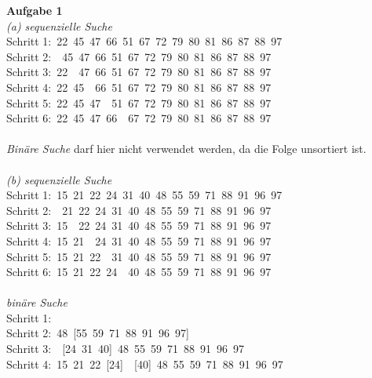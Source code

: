 \documentclass[12pt,a4paper]{article}
\begin{document}
\noindent \textbf{Aufgabe 1} \\
\textit{(a) sequenzielle Suche}\\
\indent Schritt 1:\quad {}\ 22\ 45\ 47\ 66\ 51\ 67\ 72\ 79\ 80\ 81\ 86\ 87\ 88\ 97\\
\indent Schritt 2:\ \ 45\ 47\ 66\ 51\ 67\ 72\ 79\ 80\ 81\ 86\ 87\ 88\ 97\\
\indent Schritt 3:\ 22\ \ 47\ 66\ 51\ 67\ 72\ 79\ 80\ 81\ 86\ 87\ 88\ 97\\
\indent Schritt 4:\ 22\ 45\ \ 66\ 51\ 67\ 72\ 79\ 80\ 81\ 86\ 87\ 88\ 97\\
\indent Schritt 5:\ 22\ 45\ 47\ \ 51\ 67\ 72\ 79\ 80\ 81\ 86\ 87\ 88\ 97\\
\indent Schritt 6:\ 22\ 45\ 47\ 66\ \ 67\ 72\ 79\ 80\ 81\ 86\ 87\ 88\ 97\\
\\
\indent \textit{Bin\"are Suche} darf hier nicht verwendet werden, da die Folge unsortiert ist.\\\\
\textit{(b) sequenzielle Suche}\\
\indent Schritt 1:\quad {}\ 15\ 21\ 22\ 24\ 31\ 40\ 48\ 55\ 59\ 71\ 88\ 91\ 96\ 97\\
\indent Schritt 2:\ \ 21\ 22\ 24\ 31\ 40\ 48\ 55\ 59\ 71\ 88\ 91\ 96\ 97\\
\indent Schritt 3:\ 15\ \ 22\ 24\ 31\ 40\ 48\ 55\ 59\ 71\ 88\ 91\ 96\ 97\\
\indent Schritt 4:\ 15\ 21\ \ 24\ 31\ 40\ 48\ 55\ 59\ 71\ 88\ 91\ 96\ 97\\
\indent Schritt 5:\ 15\ 21\ 22\ \ 31\ 40\ 48\ 55\ 59\ 71\ 88\ 91\ 96\ 97\\
\indent Schritt 6:\ 15\ 21\ 22\ 24\ \ 40\ 48\ 55\ 59\ 71\ 88\ 91\ 96\ 97\\
\\
\indent \textit{bin\"are Suche} \\
\indent Schritt 1:\quad [12\ 15\ 21\ 22\ 24\ 31\ 40\ \fbox{48}\ 55\ 59\ 71\ 88\ 91\ 96\ 97]\\
\indent Schritt 2:\quad [12\ 15\ 21\ \fbox{22}\ 24\ 31\ 40]\ 48\ [55\ 59\ 71\ 88\ 91\ 96\ 97]\\
\indent Schritt 3:\quad [12\ 15\ 21]\ \ [24\ 31\ 40]\ 48\ 55\ 59\ 71\ 88\ 91\ 96\ 97\\
\indent Schritt 4:\ 15\ 21\ 22\ [24]\ \ [40]\ 48\ 55\ 59\ 71\ 88\ 91\ 96\ 97\\\\
\end{document}
